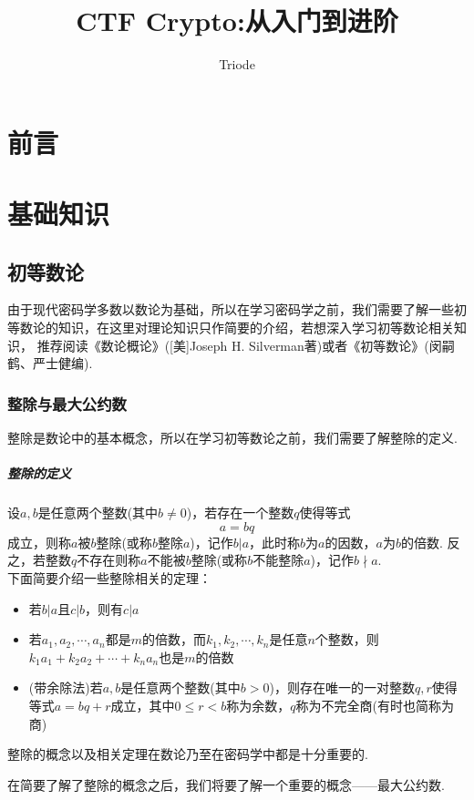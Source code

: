 \documentclass{book}
\numberwithin{equation}{subsubsection}
\begin{document}
\title{CTF Crypto:从入门到进阶}
\author{Triode}
\date{}
\maketitle

\tableofcontents
\newpage
{}

\chapter{前言}
\newpage

\chapter{基础知识}
\section{初等数论}
由于现代密码学多数以数论为基础，所以在学习密码学之前，我们需要了解一些初等数论的知识，在这里对理论知识只作简要的介绍，若想深入学习初等数论相关知识，
推荐阅读《数论概论》([美]Joseph H. Silverman著)或者《初等数论》(闵嗣鹤、严士健编).
\subsection{整除与最大公约数}
整除是数论中的基本概念，所以在学习初等数论之前，我们需要了解整除的定义.
\paragraph{\textbf{整除的定义}}
设$a,b$是任意两个整数(其中$b\neq 0$)，若存在一个整数$q$使得等式
\begin{equation}
    a = bq
    \nonumber
\end{equation}
成立，则称$a$被$b$整除(或称$b$整除$a$)，记作$b|a$，此时称$b$为$a$的因数，$a$为$b$的倍数.
反之，若整数$q$不存在则称$a$不能被$b$整除(或称$b$不能整除$a$)，记作$b\nmid a$.\\
下面简要介绍一些整除相关的定理：
\begin{itemize}
    \item 若$b|a$且$c|b$，则有$c|a$
    \item 若$a_1, a_2,\cdots,a_n$都是$m$的倍数，而$k_1,k_2,\cdots,k_n$是任意$n$个整数，则$k_1a_1+k_2a_2+\cdots+k_na_n$也是$m$的倍数
    \item (带余除法)若$a,b$是任意两个整数(其中$b>0$)，则存在唯一的一对整数$q,r$使得等式$a=bq+r$成立，其中$0\leq r < b$称为余数，$q$称为不完全商(有时也简称为商)
\end{itemize}
整除的概念以及相关定理在数论乃至在密码学中都是十分重要的.\par
在简要了解了整除的概念之后，我们将要了解一个重要的概念——最大公约数.
\end{document}
